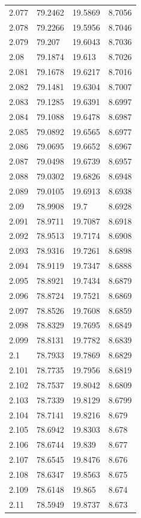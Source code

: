 \begin{tabular}{llll}
2.077 & 79.2462 & 19.5869 & 8.7056 \\
2.078 & 79.2266 & 19.5956 & 8.7046 \\
2.079 & 79.207 & 19.6043 & 8.7036 \\
2.08 & 79.1874 & 19.613 & 8.7026 \\
2.081 & 79.1678 & 19.6217 & 8.7016 \\
2.082 & 79.1481 & 19.6304 & 8.7007 \\
2.083 & 79.1285 & 19.6391 & 8.6997 \\
2.084 & 79.1088 & 19.6478 & 8.6987 \\
2.085 & 79.0892 & 19.6565 & 8.6977 \\
2.086 & 79.0695 & 19.6652 & 8.6967 \\
2.087 & 79.0498 & 19.6739 & 8.6957 \\
2.088 & 79.0302 & 19.6826 & 8.6948 \\
2.089 & 79.0105 & 19.6913 & 8.6938 \\
2.09 & 78.9908 & 19.7 & 8.6928 \\
2.091 & 78.9711 & 19.7087 & 8.6918 \\
2.092 & 78.9513 & 19.7174 & 8.6908 \\
2.093 & 78.9316 & 19.7261 & 8.6898 \\
2.094 & 78.9119 & 19.7347 & 8.6888 \\
2.095 & 78.8921 & 19.7434 & 8.6879 \\
2.096 & 78.8724 & 19.7521 & 8.6869 \\
2.097 & 78.8526 & 19.7608 & 8.6859 \\
2.098 & 78.8329 & 19.7695 & 8.6849 \\
2.099 & 78.8131 & 19.7782 & 8.6839 \\
2.1 & 78.7933 & 19.7869 & 8.6829 \\
2.101 & 78.7735 & 19.7956 & 8.6819 \\
2.102 & 78.7537 & 19.8042 & 8.6809 \\
2.103 & 78.7339 & 19.8129 & 8.6799 \\
2.104 & 78.7141 & 19.8216 & 8.679 \\
2.105 & 78.6942 & 19.8303 & 8.678 \\
2.106 & 78.6744 & 19.839 & 8.677 \\
2.107 & 78.6545 & 19.8476 & 8.676 \\
2.108 & 78.6347 & 19.8563 & 8.675 \\
2.109 & 78.6148 & 19.865 & 8.674 \\
2.11 & 78.5949 & 19.8737 & 8.673 \\

\end{tabular}
